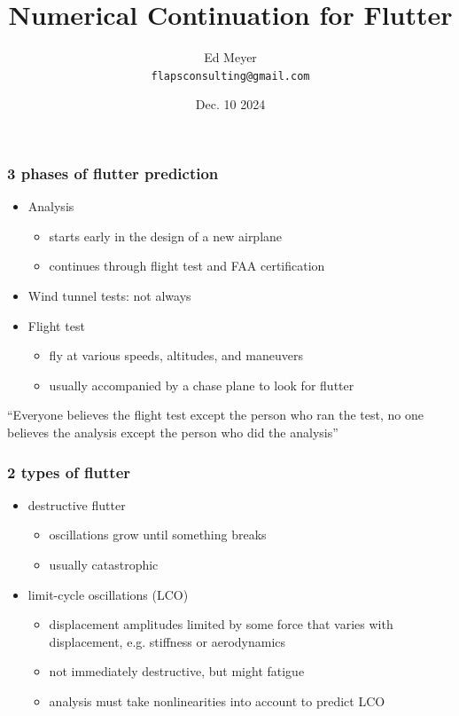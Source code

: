\documentclass{beamer}
\title{Numerical Continuation for Flutter}
\author{Ed Meyer	\\ \texttt{flapsconsulting@gmail.com}}
\date{Dec. 10 2024}
\begin{document}
\begin{frame}
	\titlepage
\end{frame}

\begin{frame}
	\frametitle{3 phases of flutter prediction}
	\begin{itemize}
		\item Analysis
			\begin{itemize}
				\item starts early in the design of a new airplane
				\item continues through flight test and FAA certification
			\end{itemize}
		\item Wind tunnel tests: not always
		\item Flight test
			\begin{itemize}
				\item fly at various speeds, altitudes, and maneuvers
				\item usually accompanied by a chase plane to look for flutter
			\end{itemize}
	\end{itemize}

	\vspace{5mm}
	``Everyone believes the flight test except the person who ran the test,
  no one believes the analysis except the person who did the analysis''
\end{frame}

\begin{frame}
	\frametitle{2 types of flutter}
	\begin{itemize}
	\item destructive flutter
		\begin{itemize}
			\item oscillations grow until something breaks
			\item usually catastrophic
		\end{itemize}
	\vspace{5mm}
	\item limit-cycle oscillations (LCO)
		\begin{itemize}
 			\item displacement amplitudes limited by some force that varies with
				displacement, e.g. stiffness or aerodynamics
			\item not immediately destructive, but might fatigue
			\item analysis must take nonlinearities into account to predict LCO
		\end{itemize}
	\end{itemize}
\end{frame}
\end{document}
